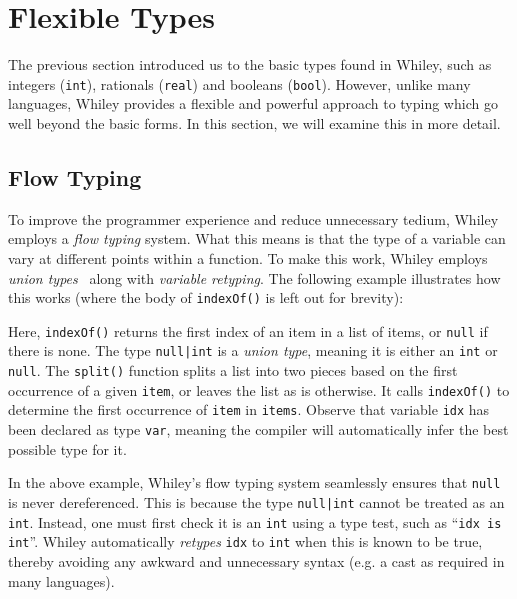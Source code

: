 \newpage
\section{Flexible Types}
The previous section introduced us to the basic types found in Whiley,
such as integers (\lstinline{int}), rationals (\lstinline{real}) and
booleans (\lstinline{bool}).  However, unlike many languages, Whiley
provides a flexible and powerful approach to typing which go well
beyond the basic forms.  In this section, we will examine this in more
detail.

\subsection{Flow Typing}
To improve the programmer experience and reduce unnecessary tedium,
Whiley employs a {\em flow typing} system.  What this means is that
the type of a variable can vary at different points within a function.
To make this work, Whiley employs {\em union types}~\cite{BC91,IN07} along with {\em variable retyping}.  The
following example illustrates how this works (where the body of
\lstinline{indexOf()} is left out for brevity):



Here, \lstinline{indexOf()} returns the first index of an item in a list of items, or \lstinline{null} if there is none.  The type \lstinline{null|int} is a {\em union type}, meaning it is either an \lstinline{int} or \lstinline{null}.  The \lstinline{split()} function splits a list into two pieces based on the first occurrence of a given \lstinline{item}, or leaves the list as is otherwise.  It calls \lstinline{indexOf()} to determine the first occurrence of \lstinline{item} in \lstinline{items}.  Observe that variable \lstinline{idx} has been declared as type \lstinline{var}, meaning the compiler will automatically infer the best possible type for it.

In the above example, Whiley's flow typing system seamlessly ensures that \lstinline{null} is never dereferenced.  This is because the type \lstinline{null|int} cannot be treated as an \lstinline{int}. Instead, one must first check it is an \lstinline{int} using a type test, such as ``\lstinline{idx is int}''.  Whiley automatically {\em retypes} \lstinline{idx} to \lstinline{int} when this is known to be true, thereby avoiding any awkward and unnecessary syntax (e.g. a cast as required in many languages).

